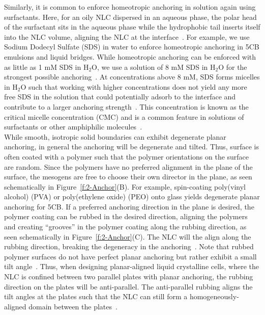 Similarly, it is common to enforce homeotropic anchoring in solution again using surfactants.
Here, for an oily NLC dispersed in an aqueous phase, the polar head of the surfactant sits in the aqueous phase while the hydrophobic tail inserts itself into the NLC volume, aligning the NLC at the interface~\cite{RN150,RN235}.
For example, we use Sodium Dodecyl Sulfate (SDS) in water to enforce homeotropic anchoring in 5CB emulsions and liquid bridges.
While homeotropic anchoring can be enforced with as little as 1 mM SDS in H$_2$O, we use a solution of 8 mM SDS in H$_2$O for the strongest possible anchoring~\cite{RN235}.
At concentrations above 8 mM, SDS forms micelles in H$_2$O such that working with higher concentrations does not yield any more free SDS in the solution that could potentially adsorb to the interface and contribute to a larger anchoring strength~\cite{RN234}.
This concentration is known as the critical micelle concentration (CMC) and is a common feature in solutions of surfactants or other amphiphilic molecules~\cite{RN233,RN234}. \\

While smooth, isotropic solid boundaries can exhibit degenerate planar anchoring, in general the anchoring will be degenerate and tilted.
Thus, surface is often coated with a polymer such that the polymer orientations on the surface are random.
Since the polymers have no preferred alignment in the plane of the surface, the mesogens are free to choose their own director in the plane, as seen schematically in Figure~\ref{f:2-Anchor}(B).
For example, spin-coating poly(vinyl alcohol) (PVA) or poly(ethylene oxide) (PEO) onto glass yields degenerate planar anchoring for 5CB.
If a preferred anchoring direction in the plane is desired, the polymer coating can be rubbed in the desired direction, aligning the polymers and creating ``grooves'' in the polymer coating along the rubbing direction, as seen schematically in Figure~\ref{f:2-Anchor}(C).
The NLC will the align along the rubbing direction, breaking the degeneracy in the anchoring~\cite{RN33,}.
Note that rubbed polymer surfaces do not have perfect planar anchoring but rather exhibit a small tilt angle~\cite{RN232}.
Thus, when designing planar-aligned liquid crystalline cells, where the NLC is confined between two parallel plates with planar anchoring, the rubbing direction on the plates will be anti-parallel.
The anti-parallel rubbing aligns the tilt angles at the plates such that the NLC can still form a homogeneously-aligned domain between the plates~\cite{RN232}. \\

